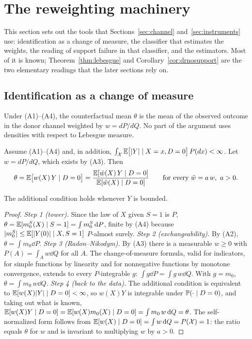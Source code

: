 \section{The reweighting machinery}\label{sec:identification}

This section sets out the tools that Sections~\ref{sec:channel} and~\ref{sec:instruments} use: identification as a change of measure, the classifier that estimates the weights, the reading of support failure in that classifier, and the estimators. Most of it is known; Theorem~\ref{thm:lebesgue} and Corollary~\ref{cor:drnosupport} are the two elementary readings that the later sections rely on.

\subsection{Identification as a change of measure}

Under (A1)--(A4), the counterfactual mean $\theta$ is the mean of the observed outcome in the donor channel weighted by $w=dP/dQ$. No part of the argument uses densities with respect to Lebesgue measure.

\begin{theorem}[Identification]\label{thm:identification}
Assume (A1)--(A4) and, in addition, $\int_{\mathcal{X}}\mathbb{E}\bigl[|Y|\mid X=x,D=0\bigr]\,P(dx)<\infty$. Let $w=dP/dQ$, which exists by (A3). Then
\[
\theta=\mathbb{E}\bigl[w(X)\,Y\mid D=0\bigr]=\frac{\mathbb{E}[\tilde w(X)\,Y\mid D=0]}{\mathbb{E}[\tilde w(X)\mid D=0]}\qquad\text{for every }\tilde w=a\,w,\ a>0.
\]
\end{theorem}
The additional condition holds whenever $Y$ is bounded.

\begin{proof}
\emph{Step 1 (tower).} Since the law of $X$ given $S=1$ is $P$, $\theta=\mathbb{E}[m_0^S(X)\mid S=1]=\int m_0^S\,\mathrm{d} P$, finite by (A4) because $|m_0^S|\le\mathbb{E}[|Y(0)|\mid X,S=1]$ $P$-almost surely.
\emph{Step 2 (exchangeability).} By (A2), $\theta=\int m_0\dd P$.
\emph{Step 3 (Radon--Nikodym).} By (A3) there is a measurable $w\ge0$ with $P(A)=\int_A w\dd Q$ for all $A$. The change-of-measure formula, valid for indicators, for simple functions by linearity and for nonnegative functions by monotone convergence, extends to every $P$-integrable $g$: $\int g\dd P=\int g\,w\dd Q$. With $g=m_0$, $\theta=\int m_0\,w\dd Q$.
\emph{Step 4 (back to the data).} The additional condition is equivalent to $\mathbb{E}[w(X)|Y|\mid D=0]<\infty$, so $w(X)Y$ is integrable under $\mathbb{P}(\cdot\mid D=0)$, and taking out what is known, $\mathbb{E}[w(X)Y\mid D=0]=\mathbb{E}[w(X)m_0(X)\mid D=0]=\int m_0\,w\,\mathrm{d} Q=\theta$.
The self-normalized form follows from $\mathbb{E}[w(X)\mid D=0]=\int w\,\mathrm{d} Q=P(\mathcal{X})=1$: the ratio equals $\theta$ for $w$ and is invariant to multiplying $w$ by $a>0$.
\end{proof}


